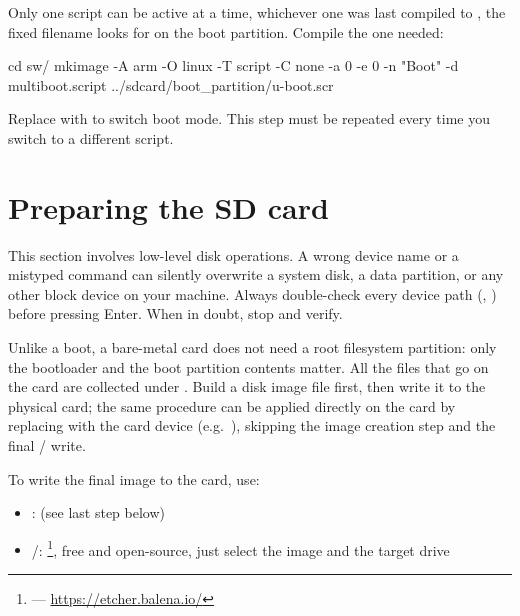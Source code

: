Only one script can be active at a time, whichever one was last compiled to , the fixed filename  looks for on the boot partition. Compile the one needed:

\begin{shellcodehost}
cd sw/
mkimage -A arm -O linux -T script -C none -a 0 -e 0 -n "Boot" -d multiboot.script ../sdcard/boot_partition/u-boot.scr
\end{shellcodehost}

Replace  with  to switch boot mode. This step must be repeated every time you switch to a different script.

\section{Preparing the SD card}
\label{sec:fpgasteel-preparing-sd-card}

\begin{warningbox}
    This section involves low-level disk operations. A wrong device name or a mistyped command can silently overwrite a system disk, a data partition, or any other block device on your machine. Always double-check every device path (, ) before pressing Enter. When in doubt, stop and verify.
\end{warningbox}

Unlike a  boot, a bare-metal  card does not need a root filesystem partition: only the bootloader and the boot partition contents matter. All the files that go on the card are collected under . Build a disk image file first, then write it to the physical  card; the same procedure can be applied directly on the  card by replacing  with the  card device (e.g.\ ), skipping the image creation step and the final / write.

To write the final image to the  card, use:

\begin{itemize}
    \item {}:  (see last step below)
    \item {}/: \footnote{ --- \url{https://etcher.balena.io/}}, free and open-source, just select the image and the target drive
\end{itemize}

